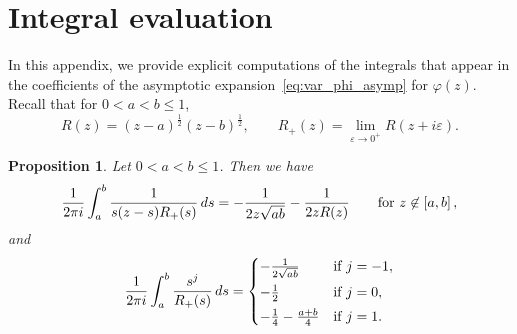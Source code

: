 \documentclass{amsart}
\theoremstyle{plain}
\newtheorem{prop}[thm]{Proposition}
\theoremstyle{remark}
\numberwithin{equation}{section}
\begin{document}
 
\appendix
\section{Integral evaluation}
\label{app:integrals}

In this appendix, we provide explicit computations of the integrals that appear in the coefficients of the asymptotic expansion~\eqref{eq:var_phi_asymp} for $\varphi(z)$. Recall that for $0<a<b \le 1$, 
$$
R(z)=(z-a)^\frac{1}{2}(z-b)^\frac{1}{2}, \qquad R_+(z) = \lim_{\varepsilon\to0^+} R(z+i\varepsilon). 
$$


\begin{prop} \label{Prop_int evaluation 1}
Let $0<a < b \le 1$. Then we have 
\begin{equation}
\label{eq:main_part_prop1}
   \frac{1}{2\pi i} \int_a^b \frac{1}{s(z-s)R_+(s)} \, ds =  -\frac{1}{2z\sqrt{ab}} - \frac{1}{2zR(z)} \qquad \textup{for } z \not\in[a,b]\,,
\end{equation}
and 
    \begin{equation}
    \label{eq:expansion_prop1}
        \frac{1}{2\pi i}\int_a^b \frac{s^j}{R_+(s)} \, ds = \begin{cases}
            -\frac{1}{2\sqrt{ab}} &\textup{if } j=-1, 
            \smallskip 
            \\
            -\frac{1}{2} &\textup{if } j=0, 
            \smallskip 
            \\
    -\frac{1}{4} - \frac{a+b}{4}  &\textup{if } j=1.  
        \end{cases}
    \end{equation} 
\end{prop}
\end{document}
